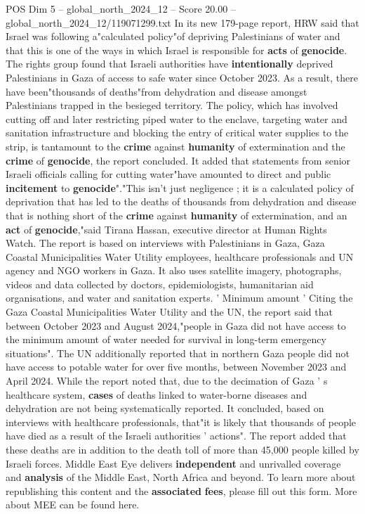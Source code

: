 \begin{textsample}{POS Dim 5 – global\_north\_2024\_12 – Score 20.00 – global\_north\_2024\_12/119071299.txt}
In its new 179-page report, HRW said that Israel was following a"calculated policy"of depriving Palestinians of water and that this is one of the ways in which Israel is responsible for \textbf{acts} of \textbf{genocide}.
The rights group found that Israeli authorities have \textbf{intentionally} deprived Palestinians in Gaza of access to safe water since October 2023.
As a result, there have been"thousands of deaths"from dehydration and disease amongst Palestinians trapped in the besieged territory.
The policy, which has involved cutting off and later restricting piped water to the enclave, targeting water and sanitation infrastructure and blocking the entry of critical water supplies to the strip, is tantamount to the \textbf{crime} against \textbf{humanity} of extermination and the \textbf{crime} of \textbf{genocide}, the report concluded.
It added that statements from senior Israeli officials calling for cutting water"have amounted to direct and public \textbf{incitement} to \textbf{genocide}"."This isn't just negligence ; it is a calculated policy of deprivation that has led to the deaths of thousands from dehydration and disease that is nothing short of the \textbf{crime} against \textbf{humanity} of extermination, and an \textbf{act} of \textbf{genocide},"said Tirana Hassan, executive director at Human Rights Watch.
The report is based on interviews with Palestinians in Gaza, Gaza Coastal Municipalities Water Utility employees, healthcare professionals and UN agency and NGO workers in Gaza.
It also uses satellite imagery, photographs, videos and data collected by doctors, epidemiologists, humanitarian aid organisations, and water and sanitation experts. ' Minimum amount ' Citing the Gaza Coastal Municipalities Water Utility and the UN, the report said that between October 2023 and August 2024,"people in Gaza did not have access to the minimum amount of water needed for survival in long-term emergency situations".
The UN additionally reported that in northern Gaza people did not have access to potable water for over five months, between November 2023 and April 2024.
While the report noted that, due to the decimation of Gaza ' s healthcare system, \textbf{cases} of deaths linked to water-borne diseases and dehydration are not being systematically reported.
It concluded, based on interviews with healthcare professionals, that"it is likely that thousands of people have died as a result of the Israeli authorities ' actions".
The report added that these deaths are in addition to the death toll of more than 45,000 people killed by Israeli forces.
Middle East Eye delivers \textbf{independent} and unrivalled coverage and \textbf{analysis} of the Middle East, North Africa and beyond.
To learn more about republishing this content and the \textbf{associated} \textbf{fees}, please fill out this form.
More about MEE can be found here.

\end{textsample}
